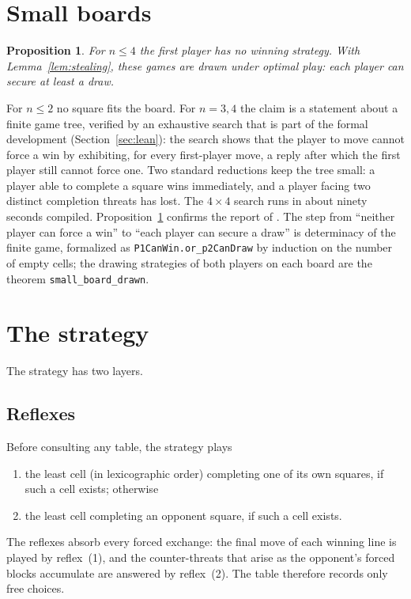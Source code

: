 \documentclass[11pt]{amsart}
\newtheorem{proposition}[theorem]{Proposition}
\theoremstyle{definition}
\theoremstyle{remark}
\begin{document}
\section{Small boards}\label{sec:small}

\begin{proposition}\label{prop:small}
For $n \le 4$ the first player has no winning strategy. With
Lemma~\ref{lem:stealing}, these games are drawn under optimal play:
each player can secure at least a draw.
\end{proposition}

For $n \le 2$ no square fits the board. For $n = 3, 4$ the claim is a
statement about a finite game tree, verified by an exhaustive search
that is part of the formal development (Section~\ref{sec:lean}): the
search shows that the player to move cannot force a win by
exhibiting, for every first-player move, a reply after which the first
player still cannot force one. Two standard reductions keep the tree
small: a player able to complete a square wins immediately, and a
player facing two distinct completion threats has lost. The
$4 \times 4$ search runs in about ninety seconds compiled.
Proposition~\ref{prop:small} confirms the report of \cite{jenrich}.
The step from ``neither player can force a win'' to ``each player can
secure a draw'' is determinacy of the finite game, formalized as
\texttt{P1CanWin.or\_p2CanDraw} by induction on the number of empty
cells; the drawing strategies of both players on each board are the
theorem \texttt{small\_board\_drawn}.

\section{The strategy}\label{sec:strategy}

The strategy has two layers.

\subsection{Reflexes}
Before consulting any table, the strategy plays
\begin{enumerate}
  \item the least cell (in lexicographic order) completing one of its
    own squares, if such a cell exists; otherwise
  \item the least cell completing an opponent square, if such a cell
    exists.
\end{enumerate}
The reflexes absorb every forced exchange: the final move of each
winning line is played by reflex~(1), and the counter-threats that
arise as the opponent's forced blocks accumulate are answered by
reflex~(2). The table therefore records only free choices.
\end{document}
